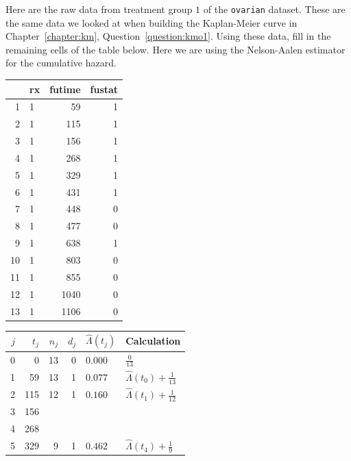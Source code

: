 \begin{question}{}
Here are the raw data from treatment group $1$ of the \texttt{ovarian} dataset. These are the same data we looked at when building the Kaplan-Meier curve in Chapter~\ref{chapter:km}, Question~\ref{question:kmo1}. Using these data, fill in the remaining cells of the table below. Here we are using the Nelson-Aalen estimator for the cumulative hazard. 
{\footnotesize
\begin{center}
\begin{tabular}{rlrr}
  \toprule
 & rx & futime & fustat \\ 
  \midrule
  1 & 1 & 59 & 1 \\ 
  2 & 1 & 115 & 1 \\ 
  3 & 1 & 156 & 1 \\ 
  4 & 1 & 268 & 1 \\ 
  5 & 1 & 329 & 1 \\ 
  6 & 1 & 431 & 1 \\ 
  7 & 1 & 448 & 0 \\ 
  8 & 1 & 477 & 0 \\ 
  9 & 1 & 638 & 1 \\ 
  10 & 1 & 803 & 0 \\ 
  11 & 1 & 855 & 0 \\ 
  12 & 1 & 1040 & 0 \\ 
  13 & 1 & 1106 & 0 \\ 
  \bottomrule
\end{tabular}
\end{center}
}
\vspace{-5mm}
{\footnotesize
\begin{center}
\begin{tabular}{rrrrll}
  \toprule
$j$ & $t_j$ & $n_j$ & $d_j$ & $\hat{\Lambda}(t_j)$ & Calculation \\ 
  \midrule
  0 & 0 & 13 & 0 & $0.000$ & $\frac{0}{13}$ \\
  1 & 59 & 13 & 1 & $0.077$ & $\hat{\Lambda}(t_0) + \frac{1}{13}$ \\
  2 & 115 & 12 & 1 & $0.160$ & $\hat{\Lambda}(t_1) + \frac{1}{12}$ \\[2mm]
  3 & 156 & \\[2mm] %
  4 & 268 & \\[2mm] %
  5 & 329 & 9 & 1 & $0.462$ & $\hat{\Lambda}(t_4) + \frac{1}{9}$ \\

\end{tabular}
\end{center}}
\end{question}
